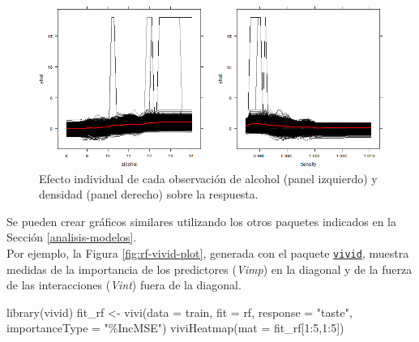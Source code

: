 \documentclass[
]{book}
\newenvironment{Shaded}{\begin{snugshade}}{\end{snugshade}}
\newcommand{\AttributeTok}[1]{\textcolor[rgb]{0.77,0.63,0.00}{#1}}
\newcommand{\DecValTok}[1]{\textcolor[rgb]{0.00,0.00,0.81}{#1}}
\newcommand{\FunctionTok}[1]{\textcolor[rgb]{0.00,0.00,0.00}{#1}}
\newcommand{\NormalTok}[1]{#1}
\newcommand{\OtherTok}[1]{\textcolor[rgb]{0.56,0.35,0.01}{#1}}
\newcommand{\SpecialCharTok}[1]{\textcolor[rgb]{0.00,0.00,0.00}{#1}}
\newcommand{\StringTok}[1]{\textcolor[rgb]{0.31,0.60,0.02}{#1}}
\theoremstyle{break}
\theoremstyle{nonumberplain}
\begin{document}
\begin{figure}[!htb]

{\centering \includegraphics[width=0.9\linewidth]{images/rf-ice-1} 

}

\caption{Efecto individual de cada observación de alcohol (panel izquierdo) y densidad (panel derecho) sobre la respuesta.}\label{fig:rf-ice-plot}
\end{figure}

Se pueden crear gráficos similares utilizando los otros paquetes indicados en la Sección \ref{analisis-modelos}.\\
Por ejemplo, la Figura \ref{fig:rf-vivid-plot}, generada con el paquete \href{https://alaninglis.github.io/vivid}{\texttt{vivid}}, muestra medidas de la importancia de los predictores (\emph{Vimp}) en la diagonal y de la fuerza de las interacciones (\emph{Vint}) fuera de la diagonal.

\begin{Shaded}
\begin{Highlighting}[]
\FunctionTok{library}\NormalTok{(vivid)}
\NormalTok{fit\_rf }\OtherTok{\textless{}{-}} \FunctionTok{vivi}\NormalTok{(}\AttributeTok{data =}\NormalTok{ train, }\AttributeTok{fit =}\NormalTok{ rf, }\AttributeTok{response =} \StringTok{"taste"}\NormalTok{, }
               \AttributeTok{importanceType =} \StringTok{"\%IncMSE"}\NormalTok{)}
\FunctionTok{viviHeatmap}\NormalTok{(}\AttributeTok{mat =}\NormalTok{ fit\_rf[}\DecValTok{1}\SpecialCharTok{:}\DecValTok{5}\NormalTok{,}\DecValTok{1}\SpecialCharTok{:}\DecValTok{5}\NormalTok{])}
\end{Highlighting}
\end{Shaded}
\end{document}
